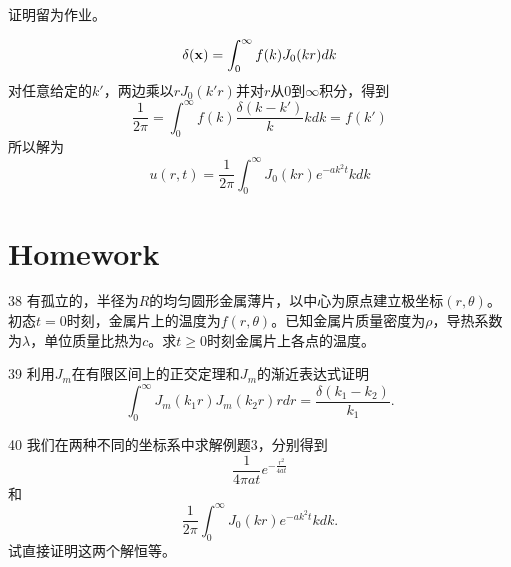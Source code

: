 \documentclass[CJK]{beamer}
\begin{document}
\begin{frame}
  \bch
  证明留为作业。
  \ech
\end{frame}


\begin{frame}
  \bch
  $$  \delta({\mathbf{x}}) = \int_0^\infty f(k) J_0(kr) dk $$
  对任意给定的$k'$，两边乘以$rJ_0(k'r)$并对$r$从$0$到$\infty$积分，得到
  $$ \frac{1}{2\pi} = \int_0^\infty f(k)\frac{\delta(k-k')}{k} k dk =f(k')$$
  所以解为
  $$  u(r, t) = \frac{1}{2\pi} \int_0^\infty J_0(kr)e^{-ak^2t} k dk $$  
  \ech
\end{frame}



\section{Homework}

\begin{frame}
  \bch
  \bitem
\item[38]{  有孤立的，半径为$R$的均匀圆形金属薄片，以中心为原点建立极坐标$(r,\theta)$。初态$t=0$时刻，金属片上的温度为$f(r,\theta)$。已知金属片质量密度为$\rho$，导热系数为$\lambda$，单位质量比热为$c$。求$t\ge 0$时刻金属片上各点的温度。}
\item[39]{利用$J_m$在有限区间上的正交定理和$J_m$的渐近表达式证明
  $$ \int_0^\infty J_m(k_1r)J_m(k_2r) r dr = \frac{\delta(k_1-k_2)}{k_1}. $$ }
\item[40]{  
  我们在两种不同的坐标系中求解例题3，分别得到
  $$\frac{1}{4\pi at}e^{-\frac{r^2}{4at}}$$
  和
  $$ \frac{1}{2\pi} \int_0^\infty J_0(kr)e^{-ak^2t} k dk.$$
  试直接证明这两个解恒等。}
  \eitem
  \ech
\end{frame}
\end{document}
